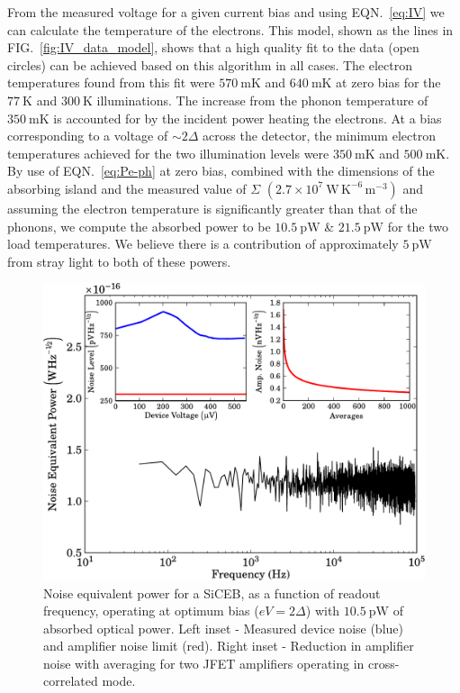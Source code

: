 \documentclass[aip, apl, a4paper, amsmath,amssymb, reprint]{revtex4-1}
\begin{document}
From the measured voltage for a given current bias and using EQN.~\ref{eq:IV} we can calculate the temperature of the electrons. This model, shown as the lines in FIG.~\ref{fig:IV_data_model}, shows that a high quality fit to the data (open circles) can be achieved based on this algorithm in all cases. The electron temperatures found from this fit were $570~\mathrm{mK}$ and $640~\mathrm{mK}$ at zero bias for the $77~\mathrm{K}$ and $300~\mathrm{K}$ illuminations. The increase from the phonon temperature of $350~\mathrm{mK}$ is accounted for by the incident power heating the electrons. At a bias corresponding to a voltage of $\sim 2\Delta$ across the detector, the minimum electron temperatures achieved for the two illumination levels were $350~\mathrm{mK}$ and $500~\mathrm{mK}$. By use of EQN.~\ref{eq:Pe-ph} at zero bias, combined with the dimensions of the absorbing island and the measured value of $\Sigma$ $(2.7 \times 10^{7}~\mathrm{W\,K^{-6}\,m^{-3}})$ and assuming the electron temperature is significantly greater than that of the phonons, we compute the absorbed power to be $10.5~\mathrm{pW}$ \& $21.5~\mathrm{pW}$ for the two load temperatures. We believe there is a contribution of approximately $5~\mathrm{pW}$ from stray light to both of these powers.
\begin{figure}[t]
\includegraphics[width = 0.8\columnwidth]{NEP_ampNoise_APL}
\caption{Noise equivalent power for a SiCEB, as a function of readout frequency, operating at optimum bias ($eV=2\Delta$) with $10.5~\mathrm{pW}$ of absorbed optical power. Left inset - Measured device noise (blue) and amplifier noise limit (red). Right inset - Reduction in amplifier noise with averaging for two JFET amplifiers operating in cross-correlated mode.}
\label{fig:NEP_ampNoise}
\end{figure}
\end{document}
